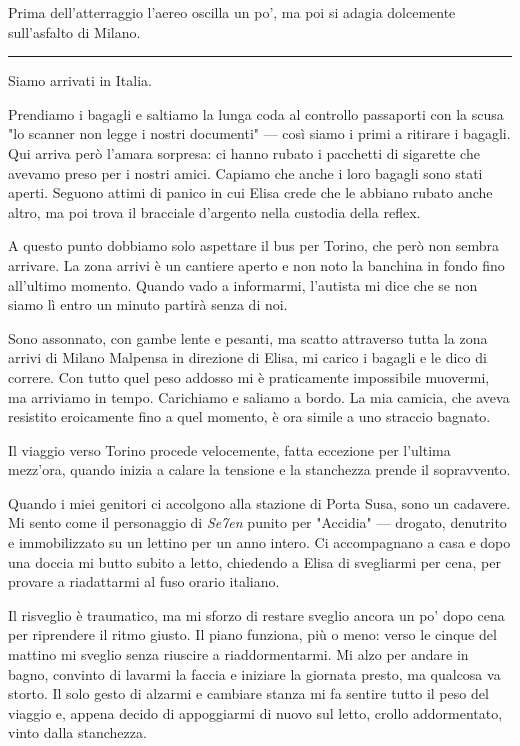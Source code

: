 Prima dell'atterraggio l'aereo oscilla un po', ma poi si adagia dolcemente sull'asfalto di Milano.

\begin{center}
    \noindent\rule{0.6\textwidth}{0.4pt}
\end{center}

Siamo arrivati in Italia.

Prendiamo i bagagli e saltiamo la lunga coda al controllo passaporti con la scusa "lo scanner non legge i nostri documenti" — così siamo i primi a ritirare i bagagli. Qui arriva però l'amara sorpresa: ci hanno rubato i pacchetti di sigarette che avevamo preso per i nostri amici. Capiamo che anche i loro bagagli sono stati aperti. Seguono attimi di panico in cui Elisa crede che le abbiano rubato anche altro, ma poi trova il bracciale d'argento nella custodia della reflex.

A questo punto dobbiamo solo aspettare il bus per Torino, che però non sembra arrivare. La zona arrivi è un cantiere aperto e non noto la banchina in fondo fino all'ultimo momento. Quando vado a informarmi, l'autista mi dice che se non siamo lì entro un minuto partirà senza di noi.

Sono assonnato, con gambe lente e pesanti, ma scatto attraverso tutta la zona arrivi di Milano Malpensa in direzione di Elisa, mi carico i bagagli e le dico di correre. Con tutto quel peso addosso mi è praticamente impossibile muovermi, ma arriviamo in tempo. Carichiamo e saliamo a bordo. La mia camicia, che aveva resistito eroicamente fino a quel momento, è ora simile a uno straccio bagnato.

Il viaggio verso Torino procede velocemente, fatta eccezione per l'ultima mezz'ora, quando inizia a calare la tensione e la stanchezza prende il sopravvento.

Quando i miei genitori ci accolgono alla stazione di Porta Susa, sono un cadavere. Mi sento come il personaggio di \textit{Se7en} punito per "Accidia" — drogato, denutrito e immobilizzato su un lettino per un anno intero. Ci accompagnano a casa e dopo una doccia mi butto subito a letto, chiedendo a Elisa di svegliarmi per cena, per provare a riadattarmi al fuso orario italiano.

Il risveglio è traumatico, ma mi sforzo di restare sveglio ancora un po' dopo cena per riprendere il ritmo giusto. Il piano funziona, più o meno: verso le cinque del mattino mi sveglio senza riuscire a riaddormentarmi. Mi alzo per andare in bagno, convinto di lavarmi la faccia e iniziare la giornata presto, ma qualcosa va storto. Il solo gesto di alzarmi e cambiare stanza mi fa sentire tutto il peso del viaggio e, appena decido di appoggiarmi di nuovo sul letto, crollo addormentato, vinto dalla stanchezza.


\pagestyle{empty} %


\pagestyle{fancy} %
